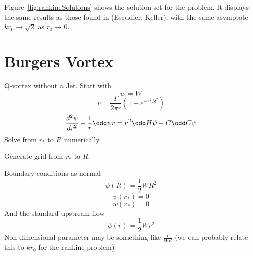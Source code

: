 \documentclass{X:/Documents/Coding/Latex/myreport}
\begin{document}
Figure~\ref{fig:rankineSolutions} shows the solution set for the problem. It displays the same results as those found in (Escudier, Keller), with the same asymptote $kr_0 \to \sqrt{2}$ as $r_0 \to 0$.
%

\clearpage
\section{Burgers Vortex}
Q-vortex without a Jet.
Start with 
\[w = W\]
\[v = \frac{\Gamma}{2\pi r} \left(1 - e^{-r^2/\delta^2}\right)\]
\[\frac{d^2\psi}{dr^2} - \frac1r \odd \psi r = r^2 \odd H\psi - C \odd C\psi \]
Solve from $r_*$ to $R$ numerically.

Generate grid from $r_*$ to $R$.

Boundary conditions as normal
\[\psi(R) = \frac12 WR^2\]
\[\psi(r_*) = 0\]
\[w(r_*) = 0\]
And the standard upstream flow 
\[\psi(r)  =\frac12 Wr^2\]
Non-dimensional parameter may be something like $\frac{\Gamma}{WR}$ (we can probably relate this to $kr_0$ for the rankine problem)
\end{document}
